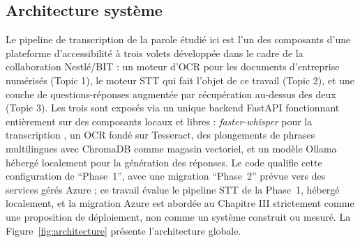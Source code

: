 \documentclass[12pt]{report}
\begin{document}
\subsection{Architecture système}
Le pipeline de transcription de la parole étudié ici est l'un des composants d'une plateforme d'accessibilité à trois volets développée dans le cadre de la collaboration Nestl\'e/BIT : un moteur d'OCR pour les documents d'entreprise numérisés (Topic 1), le moteur STT qui fait l'objet de ce travail (Topic 2), et une couche de questions-réponses augmentée par récupération au-dessus des deux (Topic 3). Les trois sont exposés via un unique backend FastAPI fonctionnant entièrement sur des composants locaux et libres : \textit{faster-whisper} pour la transcription \cite{fasterwhisper2023}, un OCR fondé sur Tesseract, des plongements de phrases multilingues avec ChromaDB comme magasin vectoriel, et un modèle Ollama hébergé localement pour la génération des réponses. Le code qualifie cette configuration de \enquote{Phase~1}, avec une migration \enquote{Phase~2} prévue vers des services gérés Azure ; ce travail évalue le pipeline STT de la Phase~1, hébergé localement, et la migration Azure est abordée au Chapitre III strictement comme une proposition de déploiement, non comme un système construit ou mesuré. La Figure~\ref{fig:architecture} présente l'architecture globale.
\end{document}
